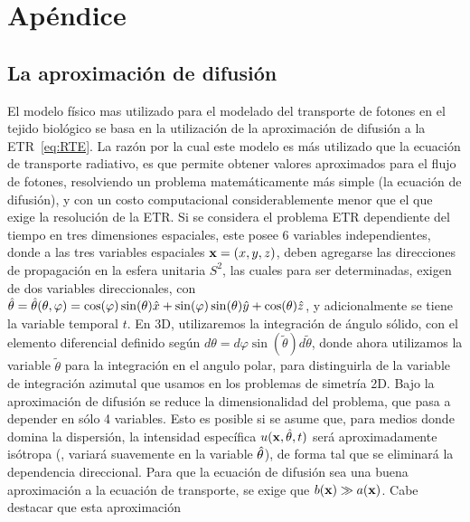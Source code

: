 \appendix
\chapter{Apéndice}%
\lhead{\thepage}
\vspace{0.01\textheight}
\section{La aproximación de difusión}
\label{ap:ecdiff}

El modelo físico mas utilizado para el modelado del transporte de fotones en el 
tejido biológico se basa en la utilización de la aproximación de 
difusión a la ETR~\eqref{eq:RTE}. La razón por la cual este modelo es más utilizado 
que la ecuación de transporte radiativo, es que permite obtener valores 
aproximados para el flujo de fotones, resolviendo un problema matemáticamente 
más simple (la ecuación de difusión), y con un costo computacional 
considerablemente menor que el que exige la resolución de la ETR. 
Si se considera el problema ETR dependiente del tiempo 
en tres dimensiones espaciales, 
este posee 6 variables independientes, donde a las tres variables espaciales $\mathbf{x}=(x,y,z)$, 
deben agregarse las direcciones de propagación en la esfera unitaria $S^2$, las 
cuales para ser determinadas, exigen de dos variables direccionales, con $\hat{\theta}=\hat{\theta}(\theta,\varphi)=\cos(\varphi)\sin(\theta)\hat x+\sin(\varphi)\sin(\theta)\hat y+\cos(\theta) \hat z$, y adicionalmente se tiene la variable temporal $t$. En 3D, utilizaremos 
la integración de ángulo sólido, con el elemento diferencial definido según 
$d\theta= d\varphi \sin(\tilde{\theta}) d\tilde{\theta}$, 
donde ahora utilizamos la variable $\tilde{\theta}$ para la integración en el angulo polar, 
para distinguirla de la variable de integración azimutal que usamos en los problemas de simetría 2D. Bajo la aproximación 
de difusión se reduce la dimensionalidad del problema, que pasa a depender en sólo 4 variables. 
Esto es posible si se asume que, para medios donde domina la dispersión, 
la intensidad específica $u(\mathbf{x},\hat{\theta},t)$ será aproximadamente 
isótropa (\ie, variará suavemente en la variable $\hat{\theta}$), 
de forma tal que se eliminará la dependencia direccional. Para que la 
ecuación de difusión sea una buena aproximación a la ecuación de 
transporte, se exige que $b(\mathbf{x})\gg a(\mathbf{x})$. Cabe destacar que esta aproximación 
